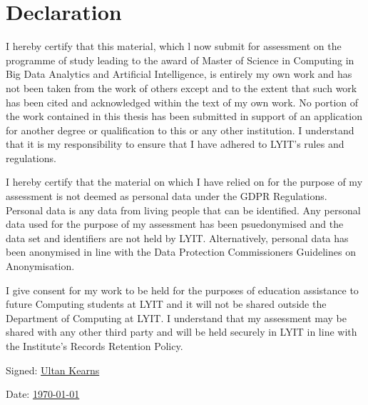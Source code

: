 \documentclass[a4paper,11pt]{report}
\begin{document}

\chapter*{Declaration}

I hereby certify that this material, which l now submit for assessment on the programme of study leading to the award of Master of Science in Computing in Big Data Analytics and Artificial Intelligence, is entirely my own work and has not been taken from the work of others except and to the extent that such work has been cited and acknowledged within the text of my own work. No portion of the work contained in this thesis has been submitted in support of an application for another degree or qualification to this or any other institution. I understand that it is my responsibility to ensure that I have adhered to LYIT’s rules and regulations. 
\bigskip

I hereby certify that the material on which I have relied on for the purpose of my assessment is not deemed as personal data under the GDPR Regulations. Personal data is any data from living people that can be identified. Any personal data used for the purpose of my assessment has been psuedonymised and the data set and identifiers are not held by LYIT. Alternatively, personal data has been anonymised in line with the Data Protection Commissioners Guidelines on Anonymisation.
\bigskip

I give consent for my work to be held for the purposes of education assistance to future Computing students at LYIT and it will not be shared outside the Department of Computing at LYIT. I understand that my assessment may be shared with any other third party and will be held securely in LYIT in line with the Institute's Records Retention Policy. 

\vspace{20pt}

\hspace{60pt} Signed: \underline{\quad \quad Ultan Kearns\hspace{240pt}} 


\bigskip

\hspace{70pt} Date: \underline{\quad \quad\today\hspace{150pt}} 


\listoffigures
\listoftables






\printbibliography
\end{document}
